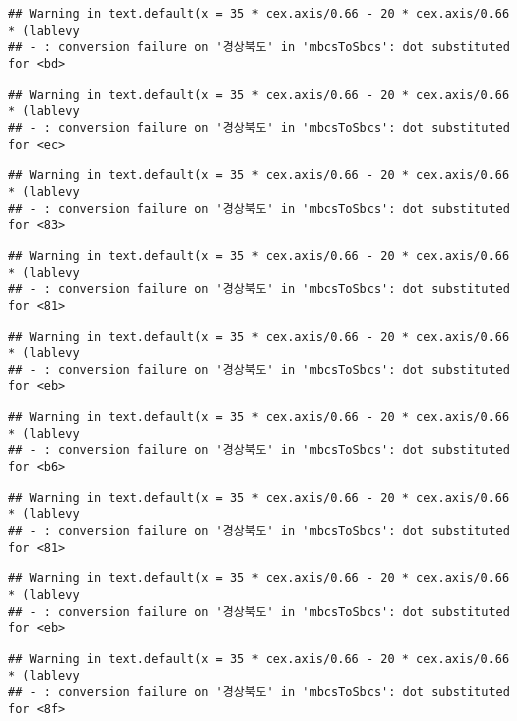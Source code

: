 \documentclass[
]{article}
\begin{document}
\begin{verbatim}
## Warning in text.default(x = 35 * cex.axis/0.66 - 20 * cex.axis/0.66 * (lablevy
## - : conversion failure on '경상북도' in 'mbcsToSbcs': dot substituted for <bd>
\end{verbatim}

\begin{verbatim}
## Warning in text.default(x = 35 * cex.axis/0.66 - 20 * cex.axis/0.66 * (lablevy
## - : conversion failure on '경상북도' in 'mbcsToSbcs': dot substituted for <ec>
\end{verbatim}

\begin{verbatim}
## Warning in text.default(x = 35 * cex.axis/0.66 - 20 * cex.axis/0.66 * (lablevy
## - : conversion failure on '경상북도' in 'mbcsToSbcs': dot substituted for <83>
\end{verbatim}

\begin{verbatim}
## Warning in text.default(x = 35 * cex.axis/0.66 - 20 * cex.axis/0.66 * (lablevy
## - : conversion failure on '경상북도' in 'mbcsToSbcs': dot substituted for <81>
\end{verbatim}

\begin{verbatim}
## Warning in text.default(x = 35 * cex.axis/0.66 - 20 * cex.axis/0.66 * (lablevy
## - : conversion failure on '경상북도' in 'mbcsToSbcs': dot substituted for <eb>
\end{verbatim}

\begin{verbatim}
## Warning in text.default(x = 35 * cex.axis/0.66 - 20 * cex.axis/0.66 * (lablevy
## - : conversion failure on '경상북도' in 'mbcsToSbcs': dot substituted for <b6>
\end{verbatim}

\begin{verbatim}
## Warning in text.default(x = 35 * cex.axis/0.66 - 20 * cex.axis/0.66 * (lablevy
## - : conversion failure on '경상북도' in 'mbcsToSbcs': dot substituted for <81>
\end{verbatim}

\begin{verbatim}
## Warning in text.default(x = 35 * cex.axis/0.66 - 20 * cex.axis/0.66 * (lablevy
## - : conversion failure on '경상북도' in 'mbcsToSbcs': dot substituted for <eb>
\end{verbatim}

\begin{verbatim}
## Warning in text.default(x = 35 * cex.axis/0.66 - 20 * cex.axis/0.66 * (lablevy
## - : conversion failure on '경상북도' in 'mbcsToSbcs': dot substituted for <8f>
\end{verbatim}
\end{document}
